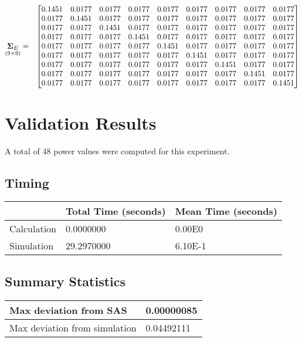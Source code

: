 \documentclass{glimmpse-report}
\begin{document}
\begin{eqnarray*}
\underset{\left(9\times9\right)}{\mathbf{\Sigma}_E} & = & \begin{bmatrix}0.1451 & 0.0177 & 0.0177 & 0.0177 & 0.0177 & 0.0177 & 0.0177 & 0.0177 & 0.0177\protect\\
0.0177 & 0.1451 & 0.0177 & 0.0177 & 0.0177 & 0.0177 & 0.0177 & 0.0177 & 0.0177\protect\\
0.0177 & 0.0177 & 0.1451 & 0.0177 & 0.0177 & 0.0177 & 0.0177 & 0.0177 & 0.0177\protect\\
0.0177 & 0.0177 & 0.0177 & 0.1451 & 0.0177 & 0.0177 & 0.0177 & 0.0177 & 0.0177\protect\\
0.0177 & 0.0177 & 0.0177 & 0.0177 & 0.1451 & 0.0177 & 0.0177 & 0.0177 & 0.0177\protect\\
0.0177 & 0.0177 & 0.0177 & 0.0177 & 0.0177 & 0.1451 & 0.0177 & 0.0177 & 0.0177\protect\\
0.0177 & 0.0177 & 0.0177 & 0.0177 & 0.0177 & 0.0177 & 0.1451 & 0.0177 & 0.0177\protect\\
0.0177 & 0.0177 & 0.0177 & 0.0177 & 0.0177 & 0.0177 & 0.0177 & 0.1451 & 0.0177\protect\\
0.0177 & 0.0177 & 0.0177 & 0.0177 & 0.0177 & 0.0177 & 0.0177 & 0.0177 & 0.1451\protect\\
\end{bmatrix}
\end{eqnarray*}
\section{Validation Results}
A total of 48 power values were computed for this experiment.

\subsection{Timing}
\begin{tabular}{|l|l|l|}
\hline
 & Total Time (seconds) & Mean Time (seconds) \\ 
\hline
Calculation & 0.0000000 & 0.00E0\tabularnewline
\hline
Simulation & 29.2970000 & 6.10E-1\tabularnewline
\hline
\end{tabular}
\subsection{Summary Statistics}
\begin{tabular}{|l|l|}
\hline
Max deviation from SAS & 0.00000085\tabularnewline
\hline

Max deviation from simulation & 0.04492111\tabularnewline
\hline

\end{tabular}
\end{document}
